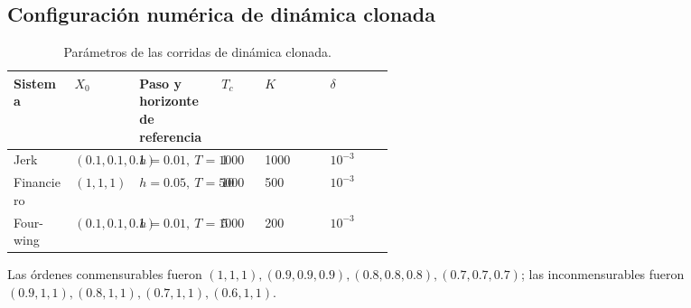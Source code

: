 \subsection{Configuración numérica de dinámica clonada}

\begin{table}[H]
\centering
\small
\caption{Parámetros de las corridas de dinámica clonada.}
\begin{tabularx}{\linewidth}{L{0.16\linewidth}L{0.15\linewidth}L{0.18\linewidth}YYY}
\toprule
Sistema & \(X_0\) & Paso y horizonte de referencia & \(T_c\) & \(K\) & \(\delta\)\\
\midrule
Jerk & \((0.1,0.1,0.1)\) & \(h=0.01,\ T=1000\) & 1 & 1000 & \(10^{-3}\)\\
Financiero & \((1,1,1)\) & \(h=0.05,\ T=5000\) & 10 & 500 & \(10^{-3}\)\\
Four-wing & \((0.1,0.1,0.1)\) & \(h=0.01,\ T=1000\) & 5 & 200 & \(10^{-3}\)\\
\bottomrule
\end{tabularx}
\end{table}

Las órdenes conmensurables fueron
\((1,1,1),(0.9,0.9,0.9),(0.8,0.8,0.8),(0.7,0.7,0.7)\); las
inconmensurables fueron
\((0.9,1,1),(0.8,1,1),(0.7,1,1),(0.6,1,1)\).

